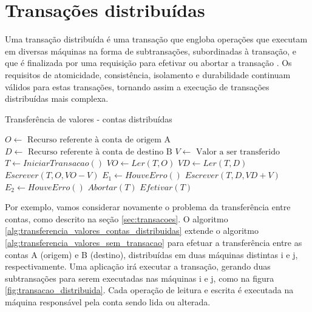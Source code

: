 \documentclass[11pt,twoside,a4paper]{book}
\begin{document}

\section{Transações distribuídas}
\label{sec:transacoes_distribuidas}

Uma transação distribuída é uma transação que engloba operações que executam em diversas máquinas na forma de subtransações, subordinadas à transação, e que é finalizada por uma requisição para efetivar ou abortar a transação \cite{gray-lamport}. Os requisitos de atomicidade, consistência, isolamento e durabilidade continuam válidos para estas transações, tornando assim a execução de transações distribuídas mais complexa.

\begin{algorithm}
\caption{Transferência de valores - contas distribuídas}
\label{alg:transferencia_valores_contas_distribuidas}
\begin{algorithmic}[1]
\State $O \gets \text{ Recurso referente à conta de origem A}$
\State $D \gets \text{ Recurso referente à conta de destino B}$
\State $V \gets \text{ Valor a ser transferido}$
\State $T \gets IniciarTransacao()$
\State $VO \gets Ler(T, O)$
    \State $VD \gets Ler(T, D)$
    \State $Escrever(T, O, VO - V)$
    \State $E_1 \gets HouveErro()$
    \State $Escrever(T, D, VD + V)$
    \State $E_2 \gets HouveErro()$
        \State $Abortar(T)$
    \Else
        \State $Efetivar(T)$
    \EndIf
\EndIf
\end{algorithmic}
\end{algorithm}

Por exemplo, vamos considerar novamente o problema da transferência entre contas, como descrito na seção \ref{sec:transacoes}. O algoritmo \ref{alg:transferencia_valores_contas_distribuidas} extende o algoritmo \ref{alg:transferencia_valores_sem_transacao} para efetuar a transferência entre as contas A (origem) e B (destino), distribuídas em duas máquinas distintas i e j, respectivamente. Uma aplicação irá executar a transação, gerando duas subtransações para serem executadas nas máquinas i e j, como na figura \ref{fig:transacao_distribuida}. Cada operação de leitura e escrita é executada na máquina responsável pela conta sendo lida ou alterada. 
\end{document}
